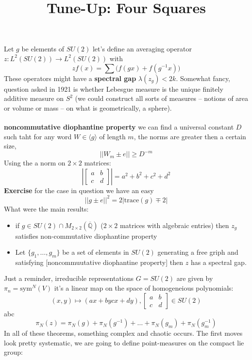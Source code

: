 \documentclass[12pt]{article}
\title{Tune-Up: Four Squares}
\date{}
\begin{document}
\sffamily

\maketitle

{\fontsize{16pt}{16pt}\selectfont 

\noindent Let $g$ be elements of $SU(2)$ let's define an averaging operator $z : L^2(SU(2)) \to L^2(SU(2)) $ with 
$$ z f(x) = \sum \big( f(gx) + f(g^{-1}x) \big)  $$
These operators might have a \textbf{spectral gap} $\lambda (z_g) < 2k$.  Somewhat fancy, question asked in 1921 is whether Lebesgue measure is the unique finitely additive measure on $S^2$ (we could construct all sorts of measures -- notions of area or volume or mass -- on what is geometrically, a sphere). \\ \\
\textbf{noncommutative diophantine property} we can find a universal constant $D$ such taht for any word $W \in \langle g \rangle$  of length $m$, the norms are greater then a certain size, 
$$ || W_m \pm e || \geq D^{-m}  $$
Using the a norm on $2 \times 2$ matrices:
$$ \left| \left[ \begin{array}{cc}  a & b \\ c & d\end{array} \right] \right| = a^2 + b^2 + c^2 + d^2 $$
\textbf{Exercise}  for the case in question we have an easy 
$$ || g \pm e||^2 = 2 |\text{trace}(g) \mp 2| $$
What were the main results:
\begin{itemize}
\item if $g \in SU(2) \cap M_{2 \times 2}(\overline{\mathbb{Q}})$ ($2 \times 2$ matrices with algebraic entries) then $z_g$ satisfies non-commutative diophantine property
\item Let $\{ g_1, \dots, g_m\}$ be a set of elements in $SU(2)$ generating a free griph and satisfying [noncommuutative diophantine property] then $z$ has a spectral gap.
\end{itemize}
Just a reminder, irreducible representations $G = SU(2)$ are given by $\pi_n = \text{sym}^N(V) $ it's a linear map on the space of homogeneious polynomials:
$$ (x,y) \mapsto (ax+by cx+dy) ,
 \left[ \begin{array}{cc} a & b \\ c & d \end{array} \right] \in SU(2) $$ 
abc
$$ \pi_N (z) = \pi_N(g) + \pi_N(g^{-1}) + \dots +  \pi_N(g_m) + \pi_N(g_m^{-1}) $$ 
In all of these theorems, something complex and chaotic occurs.  The first moves look pretty systematic, we are going to define point-measures on the compact lie group:
}
\end{document}

